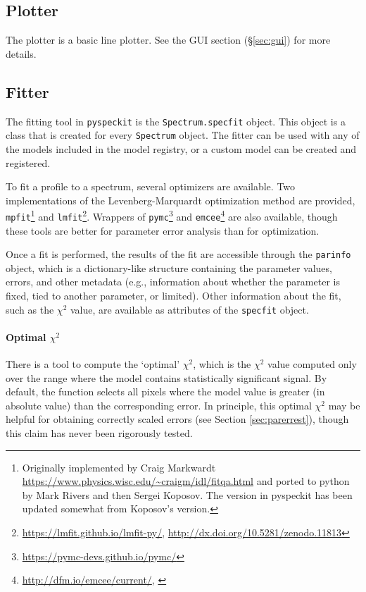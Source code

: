 \documentclass[twocolumn]{aastex62}
\newcommand{\pyspeckit}{\texttt{pyspeckit}\xspace}
\begin{document}
\subsection{Plotter}
The plotter is a basic line plotter.  See the GUI section (\S \ref{sec:gui})
for more details.


\subsection{Fitter}
\label{sec:fitters}
The fitting tool in \pyspeckit is the \texttt{Spectrum.specfit} object.
This object is a class that is created for every \texttt{Spectrum} object.
The fitter can be used with any of the models included in the model
registry, or a custom model can be created and registered.

To fit a profile to a spectrum, several optimizers are available.  Two
implementations of the Levenberg-Marquardt optimization method
\citep{Levenberg1944a,Marquardt1963a} are provided,
\texttt{mpfit}\footnote{Originally implemented by Craig Markwardt
\url{https://www.physics.wisc.edu/~craigm/idl/fitqa.html} and ported to python
by Mark Rivers and then Sergei Koposov.  The version in pyspeckit has been
updated somewhat from Koposov's version.} and
\texttt{lmfit}\footnote{\url{https://lmfit.github.io/lmfit-py/},
\url{http://dx.doi.org/10.5281/zenodo.11813}}.  Wrappers of
\texttt{pymc}\footnote{\url{https://pymc-devs.github.io/pymc/}} and
\texttt{emcee}\footnote{\url{http://dfm.io/emcee/current/},
\citet{Foreman-Mackey2013a}} are also available, though these tools are better
for parameter error analysis than for optimization.

Once a fit is performed, the results of the fit are accessible through the
\texttt{parinfo} object, which is a dictionary-like structure containing
the parameter values, errors, and other metadata (e.g., information about
whether the parameter is fixed, tied to another parameter, or limited).
Other information about the fit, such as the $\chi^2$ value, are available
as attributes of the \texttt{specfit} object.

\paragraph{Optimal $\chi^2$}
There is a tool to compute the `optimal' $\chi^2$, which is the $\chi^2$
value computed only over the range where the model contains statistically
significant signal.  By default, the function selects all pixels where
the model value is greater (in absolute value) than the corresponding error.
In principle, this optimal $\chi^2$ may be helpful for obtaining correctly
scaled errors (see Section \ref{sec:parerrest}), though this claim has never
been rigorously tested.
\end{document}
